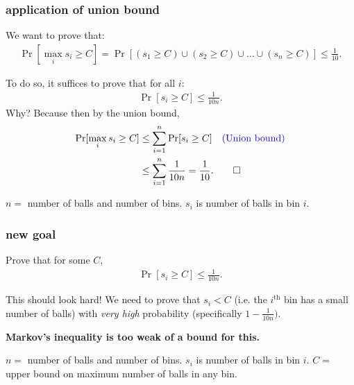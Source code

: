 \documentclass[handout,compress]{beamer}
\newcommand{\blue}[1]{\textcolor{blue}{#1}}
\begin{document}
\begin{frame}
	\frametitle{application of union bound}
	We want to prove that:
	\begin{align*}
		\Pr[\max_i s_i \geq C] = \Pr[(s_1 \geq C) \cup (s_2 \geq C) \cup \ldots \cup (s_n \geq C)] \leq \frac{1}{10}. 
	\end{align*}
	
	\alert{To do so, it suffices to prove that for all $i$:
		\begin{align*}
			\Pr[s_i \geq C] \leq \frac{1}{10n}. 
	\end{align*}}
	Why? Because then by the union bound, 
	\begin{align*}
		\Pr[\max_i s_i \geq C] &\leq \sum_{i=1}^n \Pr[s_i \geq C] \text{\hspace{1em}\blue{(Union bound)}}\\
		&\leq \sum_{i=1}^n \frac{1}{10n} = \frac{1}{10}. \qed
	\end{align*}
	

	\begin{block}{\vspace*{-3ex}}
		\small $n = $ number of balls and number of bins. $s_i$ is number of balls in bin $i$.
	\end{block}
\end{frame}

\begin{frame}
	\frametitle{new goal}
	Prove that for some $C$, 
	\begin{align*}
		\Pr[s_i \geq C] \leq \frac{1}{10n}. 
	\end{align*}
	
	\begin{center}
		This should look hard! We need to prove that $s_i < C$ (i.e. the $i^\text{th}$ bin has a small number of balls) with \emph{very high} probability (specifically $1- \frac{1}{10n})$. 
		
		\alert{\textbf{Markov's inequality is too weak of a bound for this.}}
	\end{center}
	
	\vspace{2em}
	\begin{block}{\vspace*{-3ex}}
		\small $n = $ number of balls and number of bins. $s_i$ is number of balls in bin $i$. $C =$ upper bound on maximum number of balls in any bin.
	\end{block}
\end{frame}
\end{document}

